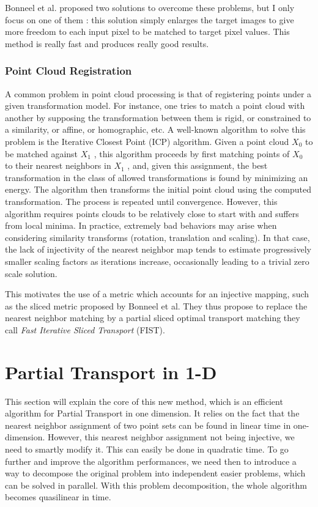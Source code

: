 \documentclass[a4paper,12pt]{article}
\begin{document}
Bonneel et al. proposed two solutions to overcome these problems, but I only focus on one of them : this solution simply enlarges the target images to give more freedom to each input pixel to be matched to target pixel values. This method is really fast and produces really good results.

\subsubsection*{Point Cloud Registration}

A common problem in point cloud processing is that of registering points under a given transformation model. For instance, one tries to match a point cloud with another by supposing the transformation between them is rigid, or constrained to a similarity, or affine, or homographic, etc. A well-known algorithm to solve this problem is the Iterative Closest Point (ICP) algorithm. Given a point cloud $X_0$ to be matched against $X_1$ , this algorithm proceeds by first matching points of $X_0$ to their nearest neighbors in $X_1$ , and, given this assignment, the best transformation in the class of allowed transformations is found by minimizing an energy. The algorithm then transforms the initial point cloud using the computed transformation. The process is repeated until convergence. However, this algorithm requires points clouds to be relatively close to start with and suffers from local minima. In practice, extremely bad behaviors may arise when considering similarity transforms (rotation, translation and scaling). In that case, the lack of injectivity of the nearest neighbor map tends to estimate progressively smaller scaling factors as iterations increase, occasionally leading to a trivial zero scale solution.

This motivates the use of a metric which accounts for an injective mapping, such as the sliced metric proposed by Bonneel et al. They thus propose to replace the nearest neighbor matching by a partial sliced optimal transport matching they call \textit{Fast Iterative Sliced Transport} (FIST). 


\newpage

\section{Partial Transport in 1-D}

This section will explain the core of this new method, which is an efficient algorithm for Partial Transport in one dimension. It relies on the fact that the nearest neighbor assignment of two point sets can be found in linear time in one-dimension. However, this nearest neighbor assignment not being injective, we need to smartly modify it. This can easily be done in quadratic time. To go further and improve the algorithm performances, we need then to introduce a way to decompose the original problem into independent easier problems, which can be solved in parallel. With this problem decomposition, the whole algorithm becomes quasilinear in time.
\end{document}
